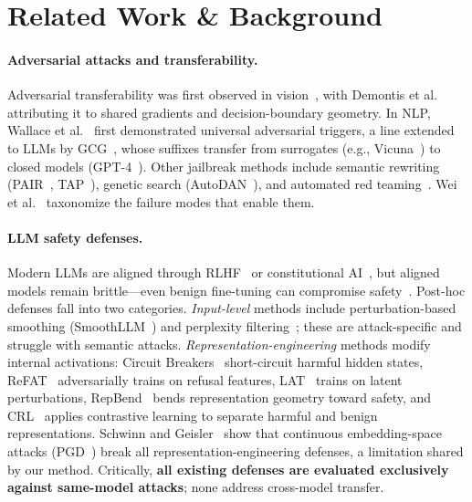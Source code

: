 \section{Related Work \& Background}
\label{sec:related}

\paragraph{Adversarial attacks and transferability.}
Adversarial transferability was first observed in vision~\citep{goodfellow2015explaining, papernot2017practical}, with Demontis et al.~\citep{demontis2019adversarial} attributing it to shared gradients and decision-boundary geometry. In NLP, Wallace et al.~\citep{wallace2019universal} first demonstrated universal adversarial triggers, a line extended to LLMs by GCG~\citep{zou2023universal}, whose suffixes transfer from surrogates (e.g., Vicuna~\citep{vicuna}) to closed models (GPT-4~\citep{openai2023gpt4}). Other jailbreak methods include semantic rewriting (PAIR~\citep{pair}, TAP~\citep{tap}), genetic search (AutoDAN~\citep{autodan}), and automated red teaming~\citep{perez2022redteaming}. Wei et al.~\citep{wei2024jailbroken} taxonomize the failure modes that enable them.

\paragraph{LLM safety defenses.}
Modern LLMs are aligned through RLHF~\citep{ouyang2022training} or constitutional AI~\citep{bai2022constitutional}, but aligned models remain brittle---even benign fine-tuning can compromise safety~\citep{qi2023finetuning}. Post-hoc defenses fall into two categories. \emph{Input-level} methods include perturbation-based smoothing (SmoothLLM~\citep{smoothllm}) and perplexity filtering~\citep{jain2023baseline}; these are attack-specific and struggle with semantic attacks. \emph{Representation-engineering} methods modify internal activations: Circuit Breakers~\citep{zou2024circuitbreakers} \mbox{short-circuit} harmful hidden states, ReFAT~\citep{refat} adversarially trains on refusal features, LAT~\citep{lat} trains on latent perturbations, RepBend~\citep{repbend} bends representation geometry toward safety, and CRL~\citep{crl} applies contrastive learning to separate harmful and benign representations. Schwinn and Geisler~\citep{revisiting_cb} show that continuous embedding-space attacks (PGD~\citep{madry2018towards}) break all representation-engineering defenses, a limitation shared by our method. Critically, \textbf{all existing defenses are evaluated exclusively against same-model attacks}; none address cross-model transfer.

